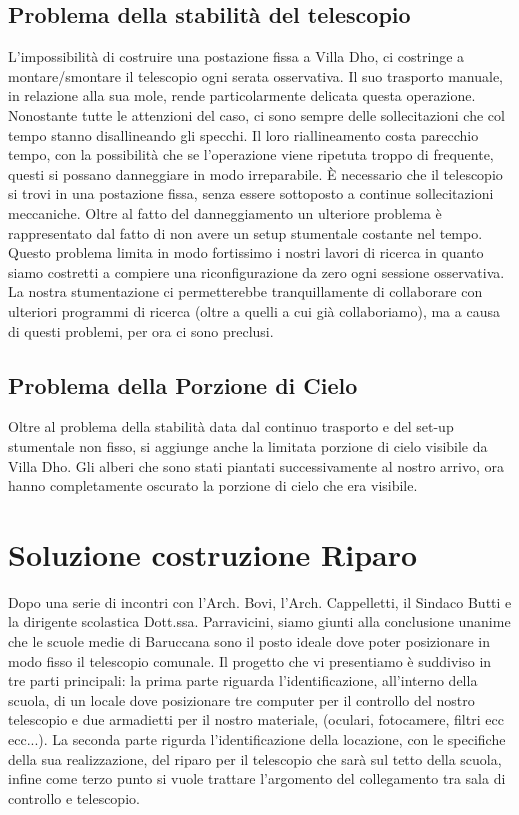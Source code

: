 \documentclass[a4paper,12pt]{article}
\begin{document}
\subsection{Problema della stabilit\`a del telescopio}
L'impossibilit\`a di costruire una postazione fissa a Villa Dho, ci costringe a montare/smontare il telescopio ogni serata osservativa. Il suo trasporto manuale, in relazione alla sua mole, rende particolarmente delicata questa operazione. Nonostante tutte le attenzioni del caso, ci sono sempre delle sollecitazioni che col tempo stanno disallineando gli specchi. Il loro riallineamento costa parecchio tempo, con la possibilit\`a che se l'operazione viene ripetuta troppo di frequente, questi si possano danneggiare in modo irreparabile. \`E necessario che il telescopio si trovi in una postazione fissa, senza essere sottoposto a continue sollecitazioni meccaniche.
Oltre al fatto del danneggiamento un ulteriore problema \`e rappresentato dal fatto di non avere un setup stumentale costante nel tempo. Questo problema limita in modo fortissimo i nostri lavori di ricerca in quanto siamo costretti a compiere una riconfigurazione da zero ogni sessione osservativa. La nostra stumentazione ci permetterebbe tranquillamente di collaborare con ulteriori programmi di ricerca (oltre a quelli a cui gi\`a collaboriamo), ma a causa di questi problemi, per ora ci sono preclusi.
\subsection{Problema della Porzione di Cielo}
Oltre al problema della stabilit\`a data dal continuo trasporto e del set-up stumentale non fisso, si aggiunge anche la limitata porzione di cielo visibile da Villa Dho. Gli alberi che sono stati piantati successivamente al nostro arrivo, ora hanno completamente oscurato la porzione di cielo che era visibile.

\section{Soluzione costruzione Riparo}
Dopo una serie di incontri con l'Arch. Bovi, l'Arch. Cappelletti, il Sindaco Butti e la dirigente scolastica Dott.ssa. Parravicini, siamo giunti alla conclusione unanime che le scuole medie di Baruccana sono il posto ideale dove poter posizionare in modo fisso il telescopio comunale. Il progetto che vi presentiamo \`e suddiviso in tre parti principali: la prima parte riguarda l'identificazione, all'interno della scuola, di un locale dove posizionare tre computer per il controllo del nostro telescopio e due armadietti per il nostro materiale, (oculari, fotocamere, filtri ecc ecc...). La seconda parte rigurda l'identificazione della locazione, con le specifiche
della sua realizzazione, del riparo per il telescopio che sar\`a sul tetto della scuola, infine come terzo punto si vuole trattare l'argomento del collegamento tra sala di controllo e telescopio.
\end{document}
